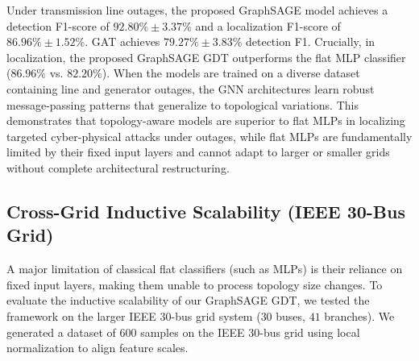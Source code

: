 \documentclass[conference]{IEEEtran}
\begin{document}
\begin{table}[htbp]
  \caption{Generalization Metrics under Grid Reconfiguration}
  \label{tab:outages}
  \centering
\end{table}

Under transmission line outages, the proposed GraphSAGE model achieves a detection F1-score of $92.80\% \pm 3.37\%$ and a localization F1-score of $86.96\% \pm 1.52\%$. GAT achieves $79.27\% \pm 3.83\%$ detection F1. Crucially, in localization, the proposed GraphSAGE GDT outperforms the flat MLP classifier ($86.96\%$ vs. $82.20\%$). When the models are trained on a diverse dataset containing line and generator outages, the GNN architectures learn robust message-passing patterns that generalize to topological variations. This demonstrates that topology-aware models are superior to flat MLPs in localizing targeted cyber-physical attacks under outages, while flat MLPs are fundamentally limited by their fixed input layers and cannot adapt to larger or smaller grids without complete architectural restructuring.

\subsection{Cross-Grid Inductive Scalability (IEEE 30-Bus Grid)}
A major limitation of classical flat classifiers (such as MLPs) is their reliance on fixed input layers, making them unable to process topology size changes. To evaluate the inductive scalability of our GraphSAGE GDT, we tested the framework on the larger IEEE 30-bus grid system ($30$ buses, $41$ branches). We generated a dataset of $600$ samples on the IEEE 30-bus grid using local normalization to align feature scales. 
\end{document}
